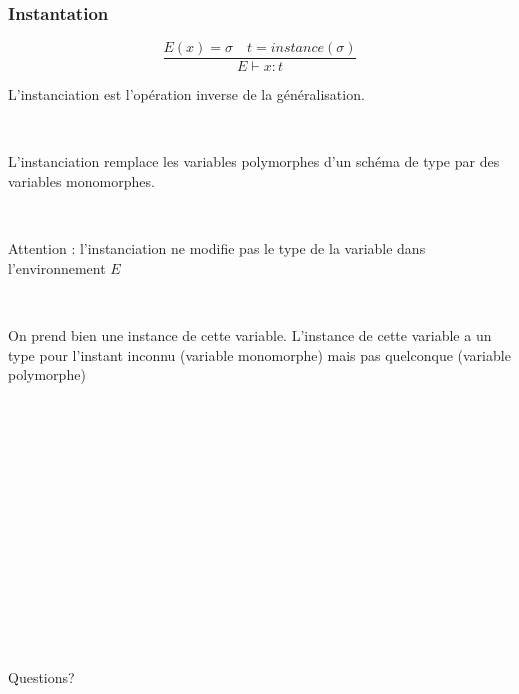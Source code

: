 \documentclass[handout,t]{beamer}
\begin{document}
\begin{frame}

\frametitle{Instantation}

$$
\frac{E(x)=\sigma\quad t=instance(\sigma)}
     {E\vdash x : t }
$$


L'instanciation est l'opération inverse de la généralisation.

~

L'instanciation remplace les variables polymorphes d'un
schéma de type par des variables monomorphes.


~

Attention : l'instanciation ne modifie pas le type de la variable
dans l'environnement
$E$ 

~

On prend bien une instance de cette
variable.
L'instance de cette variable a un type pour l'instant inconnu
(variable monomorphe) mais pas quelconque (variable
polymorphe)


\end{frame}

\begin{frame}

~

~

~

~



~

~

~

~

{\LARGE Questions?}

\end{frame}
\end{document}
